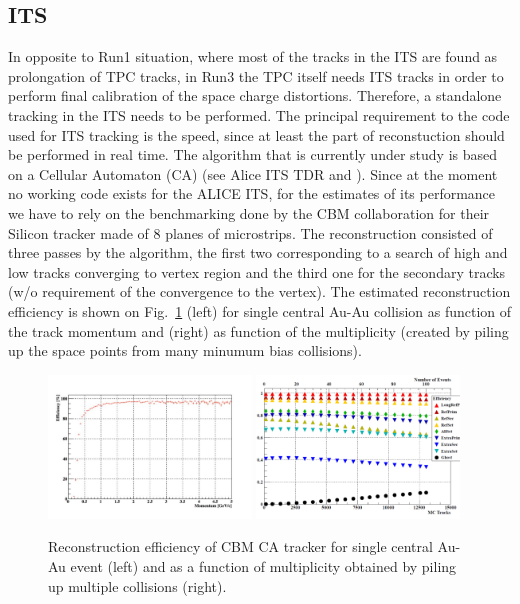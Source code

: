 \subsection{ITS}
\label{recoEPN:ITS}

In opposite to Run1 situation, where most of the tracks in the ITS are found as prolongation
of TPC tracks, in Run3 the TPC itself needs ITS tracks in order to perform final calibration of
the space charge distortions. Therefore, a standalone tracking in the ITS needs to be performed.
The principal requirement to the code used for ITS tracking is the speed, since at least the part
of reconstuction should be performed in real time.
The algorithm that is currently under study is based on a Cellular Automaton (CA) (see 
Alice ITS TDR \cite{refITSTDR} and \cite{refCA1, refCA2}). Since at the moment no working code exists 
for the ALICE ITS, for the estimates of its performance we have to rely on the benchmarking done by the
CBM collaboration for their Silicon tracker made of 8 planes of microstrips. 
The reconstruction consisted of three passes by the algorithm, the first two corresponding to a search of 
high and low \pt tracks converging to vertex region and the third one for the secondary tracks (w/o requirement
of the convergence to the vertex).
The estimated reconstruction efficiency is shown on Fig.~\ref{fig:ITSreceffCBM} (left) 
for single central Au-Au collision as function of the track momentum and (right) as function of the multiplicity
(created by piling up the space points from many minumum bias collisions). 

\begin{figure}[h]
\centering
\includegraphics[width=0.48\textwidth]{ITS/IK_CBMeff.pdf}
\includegraphics[width=0.48\textwidth]{ITS/IK_CBMeffmult.pdf}
\caption{\label{fig:ITSreceffCBM} 
Reconstruction efficiency of CBM CA tracker for single central Au-Au event (left)
and as a function of multiplicity obtained by piling up multiple collisions (right).
}
\end{figure}

